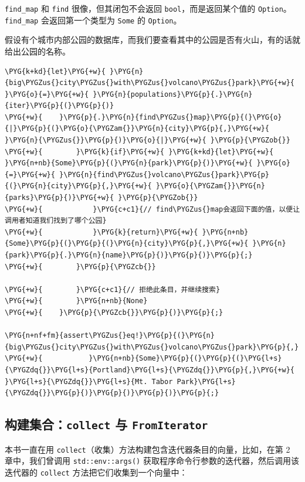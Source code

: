 \texttt{find\_map} 和 \texttt{find} 很像，但其闭包不会返回 \texttt{bool}，而是返回某个值的 \texttt{Option}。\texttt{find\_map} 会返回第一个类型为 \texttt{Some} 的 \texttt{Option}。

假设有个城市内部公园的数据库，而我们要查看其中的公园是否有火山，有的话就给出公园的名称。

\begin{Verbatim}[commandchars=\\\{\},breaklines=true,breakanywhere=true,fontsize=\codefont,xleftmargin=17bp]
\PYG{k+kd}{let}\PYG{+w}{ }\PYG{n}{big\PYGZus{}city\PYGZus{}with\PYGZus{}volcano\PYGZus{}park}\PYG{+w}{ }\PYG{o}{=}\PYG{+w}{ }\PYG{n}{populations}\PYG{p}{.}\PYG{n}{iter}\PYG{p}{(}\PYG{p}{)}
\PYG{+w}{    }\PYG{p}{.}\PYG{n}{find\PYGZus{}map}\PYG{p}{(}\PYG{o}{|}\PYG{p}{(}\PYG{o}{\PYGZam{}}\PYG{n}{city}\PYG{p}{,}\PYG{+w}{ }\PYG{n}{\PYGZus{}}\PYG{p}{)}\PYG{o}{|}\PYG{+w}{ }\PYG{p}{\PYGZob{}}
\PYG{+w}{        }\PYG{k}{if}\PYG{+w}{ }\PYG{k+kd}{let}\PYG{+w}{ }\PYG{n+nb}{Some}\PYG{p}{(}\PYG{n}{park}\PYG{p}{)}\PYG{+w}{ }\PYG{o}{=}\PYG{+w}{ }\PYG{n}{find\PYGZus{}volcano\PYGZus{}park}\PYG{p}{(}\PYG{n}{city}\PYG{p}{,}\PYG{+w}{ }\PYG{o}{\PYGZam{}}\PYG{n}{parks}\PYG{p}{)}\PYG{+w}{ }\PYG{p}{\PYGZob{}}
\PYG{+w}{            }\PYG{c+c1}{// find\PYGZus{}map会返回下面的值，以便让调用者知道我们找到了哪个公园}
\PYG{+w}{            }\PYG{k}{return}\PYG{+w}{ }\PYG{n+nb}{Some}\PYG{p}{(}\PYG{p}{(}\PYG{n}{city}\PYG{p}{,}\PYG{+w}{ }\PYG{n}{park}\PYG{p}{.}\PYG{n}{name}\PYG{p}{)}\PYG{p}{)}\PYG{p}{;}
\PYG{+w}{        }\PYG{p}{\PYGZcb{}}

\PYG{+w}{        }\PYG{c+c1}{// 拒绝此条目，并继续搜索}
\PYG{+w}{        }\PYG{n+nb}{None}
\PYG{+w}{    }\PYG{p}{\PYGZcb{}}\PYG{p}{)}\PYG{p}{;}

\PYG{n+nf+fm}{assert\PYGZus{}eq!}\PYG{p}{(}\PYG{n}{big\PYGZus{}city\PYGZus{}with\PYGZus{}volcano\PYGZus{}park}\PYG{p}{,}
\PYG{+w}{           }\PYG{n+nb}{Some}\PYG{p}{(}\PYG{p}{(}\PYG{l+s}{\PYGZdq{}}\PYG{l+s}{Portland}\PYG{l+s}{\PYGZdq{}}\PYG{p}{,}\PYG{+w}{ }\PYG{l+s}{\PYGZdq{}}\PYG{l+s}{Mt. Tabor Park}\PYG{l+s}{\PYGZdq{}}\PYG{p}{)}\PYG{p}{)}\PYG{p}{)}\PYG{p}{;}
\end{Verbatim}

\subsection{构建集合：\texttt{collect} 与 \texttt{FromIterator}}

本书一直在用 \texttt{collect}（收集）方法构建包含迭代器条目的向量，比如，在第 2 章中，我们曾调用 \texttt{std::env::args()} 获取程序命令行参数的迭代器，然后调用该迭代器的 \texttt{collect} 方法把它们收集到一个向量中：

